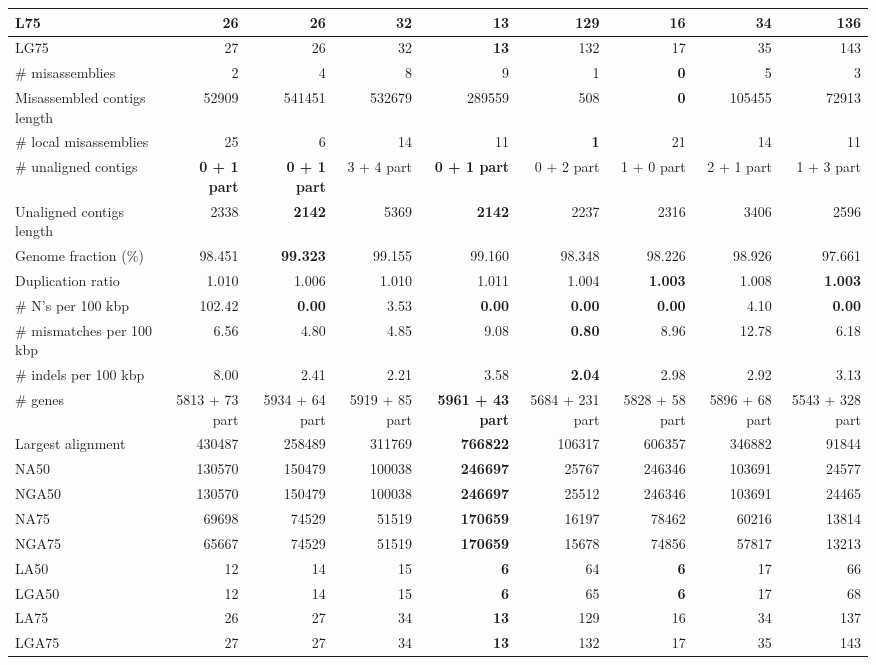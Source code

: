 \documentclass[12pt,a4paper]{article}
\begin{document}
\begin{table}[ht]
\begin{center}
\begin{tabular}{|l*{8}{|r}|}
L75 & 26 & 26 & 32 & {\bf 13} & 129 & 16 & 34 & 136 \\ \hline
LG75 & 27 & 26 & 32 & {\bf 13} & 132 & 17 & 35 & 143 \\ \hline
\# misassemblies & 2 & 4 & 8 & 9 & 1 & {\bf 0} & 5 & 3 \\ \hline
Misassembled contigs length & 52909 & 541451 & 532679 & 289559 & 508 & {\bf 0} & 105455 & 72913 \\ \hline
\# local misassemblies & 25 & 6 & 14 & 11 & {\bf 1} & 21 & 14 & 11 \\ \hline
\# unaligned contigs & {\bf 0 + 1 part} & {\bf 0 + 1 part} & 3 + 4 part & {\bf 0 + 1 part} & 0 + 2 part & 1 + 0 part & 2 + 1 part & 1 + 3 part \\ \hline
Unaligned contigs length & 2338 & {\bf 2142} & 5369 & {\bf 2142} & 2237 & 2316 & 3406 & 2596 \\ \hline
Genome fraction (\%) & 98.451 & {\bf 99.323} & 99.155 & 99.160 & 98.348 & 98.226 & 98.926 & 97.661 \\ \hline
Duplication ratio & 1.010 & 1.006 & 1.010 & 1.011 & 1.004 & {\bf 1.003} & 1.008 & {\bf 1.003} \\ \hline
\# N's per 100 kbp & 102.42 & {\bf 0.00} & 3.53 & {\bf 0.00} & {\bf 0.00} & {\bf 0.00} & 4.10 & {\bf 0.00} \\ \hline
\# mismatches per 100 kbp & 6.56 & 4.80 & 4.85 & 9.08 & {\bf 0.80} & 8.96 & 12.78 & 6.18 \\ \hline
\# indels per 100 kbp & 8.00 & 2.41 & 2.21 & 3.58 & {\bf 2.04} & 2.98 & 2.92 & 3.13 \\ \hline
\# genes & 5813 + 73 part & 5934 + 64 part & 5919 + 85 part & {\bf 5961 + 43 part} & 5684 + 231 part & 5828 + 58 part & 5896 + 68 part & 5543 + 328 part \\ \hline
Largest alignment & 430487 & 258489 & 311769 & {\bf 766822} & 106317 & 606357 & 346882 & 91844 \\ \hline
NA50 & 130570 & 150479 & 100038 & {\bf 246697} & 25767 & 246346 & 103691 & 24577 \\ \hline
NGA50 & 130570 & 150479 & 100038 & {\bf 246697} & 25512 & 246346 & 103691 & 24465 \\ \hline
NA75 & 69698 & 74529 & 51519 & {\bf 170659} & 16197 & 78462 & 60216 & 13814 \\ \hline
NGA75 & 65667 & 74529 & 51519 & {\bf 170659} & 15678 & 74856 & 57817 & 13213 \\ \hline
LA50 & 12 & 14 & 15 & {\bf 6} & 64 & {\bf 6} & 17 & 66 \\ \hline
LGA50 & 12 & 14 & 15 & {\bf 6} & 65 & {\bf 6} & 17 & 68 \\ \hline
LA75 & 26 & 27 & 34 & {\bf 13} & 129 & 16 & 34 & 137 \\ \hline
LGA75 & 27 & 27 & 34 & {\bf 13} & 132 & 17 & 35 & 143 \\ \hline
\end{tabular}
\end{center}
\end{table}
\end{document}
